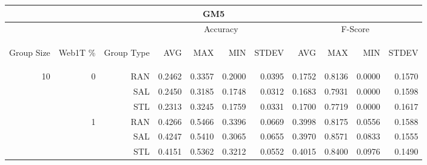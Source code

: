 \begin{center}
\begin{table}[htbp]
\begin{tabular}{ | r | r | r | r | r | r | r | r | r | r | r |}
\hline
\multicolumn{11}{|c|}{GM5}\\
\hline
 & & & \multicolumn{4}{|c|}{Accuracy} & \multicolumn{4}{|c|}{F-Score}\\ \cline{4-11}
\begin{sideways}Group Size\end{sideways} & \begin{sideways}Web1T \%\end{sideways} & \begin{sideways}Group Type\end{sideways} & \begin{sideways}AVG\end{sideways} & \begin{sideways}MAX\end{sideways} & \begin{sideways}MIN\end{sideways} & \begin{sideways}STDEV\end{sideways} & \begin{sideways}AVG\end{sideways} & \begin{sideways}MAX\end{sideways} & \begin{sideways}MIN\end{sideways} & \begin{sideways}STDEV\end{sideways}\\
\hline
\multirow{18}{*}{10}
 & \multirow{3}{*}{0} & RAN & 0.2462 & 0.3357 & 0.2000 & 0.0395 & 0.1752 & 0.8136 & 0.0000 & 0.1570\\ \cline{3-11}
 &   & SAL & 0.2450 & 0.3185 & 0.1748 & 0.0312 & 0.1683 & 0.7931 & 0.0000 & 0.1598\\ \cline{3-11}
 &   & STL & 0.2313 & 0.3245 & 0.1759 & 0.0331 & 0.1700 & 0.7719 & 0.0000 & 0.1617\\ \cline{2-11}
 & \multirow{3}{*}{1} & RAN & 0.4266 & 0.5466 & 0.3396 & 0.0669 & 0.3998 & 0.8175 & 0.0556 & 0.1588\\ \cline{3-11}
 &   & SAL & 0.4247 & 0.5410 & 0.3065 & 0.0655 & 0.3970 & 0.8571 & 0.0833 & 0.1555\\ \cline{3-11}
 &   & STL & 0.4151 & 0.5362 & 0.3212 & 0.0552 & 0.4015 & 0.8400 & 0.0976 & 0.1490\\ \cline{2-11}

\end{tabular}
\end{table}
\end{center}
